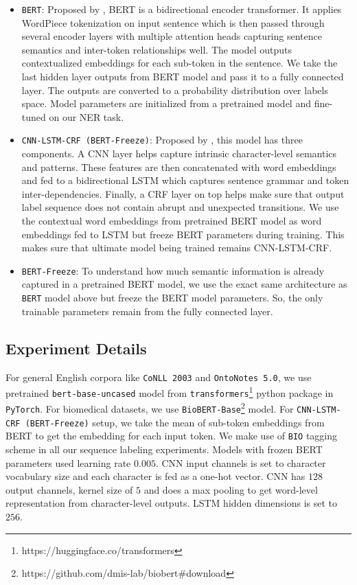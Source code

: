 \begin{itemize}

    \item \texttt{BERT}: Proposed by \cite{devlin2018bert}, BERT is a bidirectional encoder transformer\cite{vaswani2017attention}. It applies WordPiece\cite{wu2016google} tokenization on input sentence which is then passed through several encoder layers with multiple attention heads capturing sentence semantics and inter-token relationships well. The model outputs contextualized embeddings for each sub-token in the sentence. We take the last hidden layer outputs from BERT model and pass it to a fully connected layer. The outputs are converted to a probability distribution over labels space. Model parameters are initialized from a pretrained model and fine-tuned on our NER task.
    
    \item \texttt{CNN-LSTM-CRF (BERT-Freeze)}: Proposed by \cite{ma2016end}, this model has three components. A CNN layer helps capture intrinsic character-level semantics and patterns. These features are then concatenated with word embeddings and fed to a bidirectional LSTM\cite{hochreiter1997long} which captures sentence grammar and token inter-dependencies. Finally, a CRF\cite{lafferty2001conditional} layer on top helps make sure that output label sequence does not contain abrupt and unexpected transitions. We use the contextual word embeddings from pretrained BERT model as word embeddings fed to LSTM but freeze BERT parameters during training. This makes sure that ultimate model being trained remains CNN-LSTM-CRF.
    
    \item \texttt{BERT-Freeze}: To understand how much semantic information is already captured in a pretrained BERT model, we use the exact same architecture as \texttt{BERT} model above but freeze the BERT model parameters. So, the only trainable parameters remain from the fully connected layer.
\end{itemize}

\subsection{Experiment Details}
For general English corpora like \texttt{CoNLL 2003} and \texttt{OntoNotes 5.0}, we use pretrained \texttt{bert-base-uncased} model from \texttt{transformers}\footnote{https://huggingface.co/transformers} python package in \texttt{PyTorch}. For biomedical datasets, we use \texttt{BioBERT-Base}\footnote{https://github.com/dmis-lab/biobert\#download} model. For \texttt{CNN-LSTM-CRF (BERT-Freeze)} setup, we take the mean of sub-token embeddings from BERT to get the embedding for each input token. We make use of \texttt{BIO} tagging scheme in all our sequence labeling experiments. Models with frozen BERT parameters used learning rate $0.005$. CNN input channels is set to character vocabulary size and each character is fed as a one-hot vector. CNN has $128$ output channels, kernel size of $5$ and does a max pooling to get word-level representation from character-level outputs. LSTM hidden dimensions is set to $256$.

